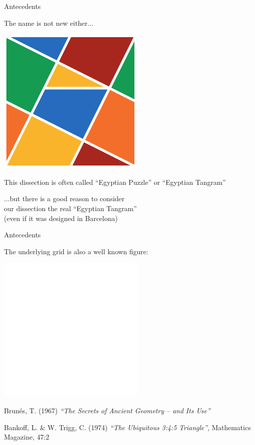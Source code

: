 \documentclass[14pt]{beamer}
\begin{document}
    \begin{frame}{Antecedents}
        \begin{center}
            The name is not new either...

            \bigskip \bigskip

            \includegraphics[height=15ex]{figures/figure000e.pdf}

            \medskip

            {\footnotesize This dissection is often called ``Egyptian Puzzle'' or ``Egyptian Tangram''}

            \bigskip \bigskip

            ...but there is a good reason to consider\\ our dissection the real ``Egyptian Tangram''\\{\footnotesize (even if it was designed in Barcelona)}
        \end{center}
    \end{frame}


    \begin{frame}{Antecedents}
        \begin{center}
            The underlying grid is also a well known figure:

            \bigskip \bigskip

            \includegraphics[height=15ex]{figures/figure002b.pdf}\\

            \bigskip

            {\footnotesize Brunés, T. (1967) \emph{``The Secrets of Ancient Geometry -- and Its Use''}}

            \medskip

            {\footnotesize Bankoff, L. \& W. Trigg, C. (1974) \emph{``The Ubiquitous 3:4:5 Triangle''}, Mathematics Magazine, 47:2}
        \end{center}
    \end{frame}
\end{document}
